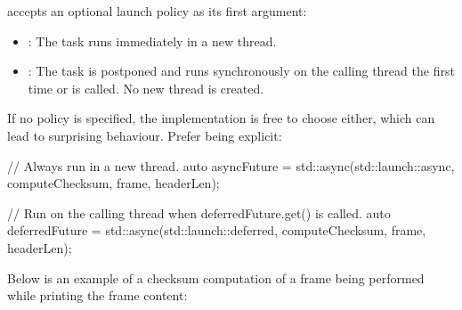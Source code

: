  accepts an optional launch policy as its first argument:
\begin{itemize}
  \item {}: The task runs immediately in a new thread.
  \item {}: The task is postponed and runs synchronously on the calling
    thread the first time  or  is called. No new thread is
    created.
\end{itemize}
If no policy is specified, the implementation is free to choose either, which can lead to
surprising behaviour. Prefer being explicit:

\begin{cppcode}
// Always run in a new thread.
auto asyncFuture = std::async(std::launch::async, computeChecksum, frame, headerLen);

// Run on the calling thread when deferredFuture.get() is called.
auto deferredFuture = std::async(std::launch::deferred, computeChecksum, frame, headerLen);
\end{cppcode}

\noindent Below is an example of a checksum computation of a frame being performed while printing
the frame content:

